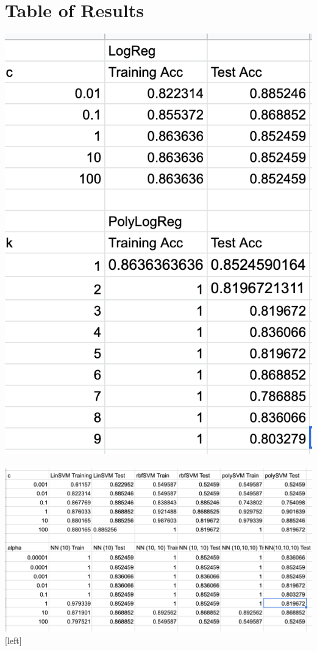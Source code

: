 \documentclass[11pt, oneside]{article}
\begin{document}
\section *{Table of Results}
\includegraphics{10}\\\\
\includegraphics{11}[left]
\end{document}
